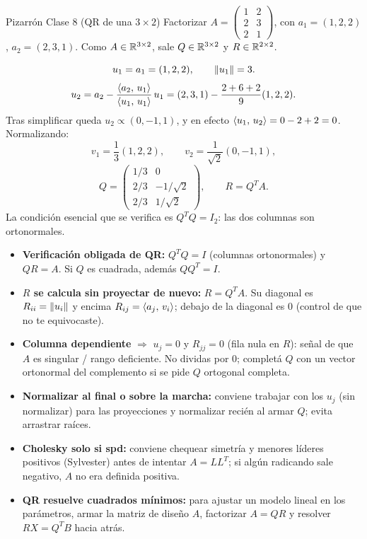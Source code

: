 \begin{ejemplo}{Pizarrón Clase 8 (QR de una $3\times 2$)}
Factorizar $A = \begin{pmatrix} 1 & 2 \\ 2 & 3 \\ 2 & 1 \end{pmatrix}$, con $a_1 = (1,2,2)$, $a_2 = (2,3,1)$. Como $A \in \mathbb{R}^{3\times 2}$, sale $Q \in \mathbb{R}^{3\times 2}$ y $R \in \mathbb{R}^{2\times 2}$.

\[
u_1 = a_1 = (1,2,2), \qquad \left\lVert u_1 \right\rVert = 3.
\]
\[
u_2 = a_2 - \frac{\left\langle a_2,\, u_1 \right\rangle}{\left\langle u_1,\, u_1 \right\rangle}\,u_1 = (2,3,1) - \frac{2+6+2}{9}(1,2,2).
\]
Tras simplificar queda $u_2 \propto (0,-1,1)$, y en efecto $\left\langle u_1,\, u_2 \right\rangle = 0 - 2 + 2 = 0$. Normalizando:
\[
v_1 = \frac{1}{3}(1,2,2), \qquad v_2 = \frac{1}{\sqrt{2}}(0,-1,1),
\]
\[
Q = \begin{pmatrix} 1/3 & 0 \\ 2/3 & -1/\sqrt{2} \\ 2/3 & 1/\sqrt{2} \end{pmatrix}, \qquad R = Q^T A.
\]
La condición esencial que se verifica es $Q^T Q = I_2$: las dos columnas son ortonormales.
\end{ejemplo}

\begin{truco}
\begin{itemize}
\item \textbf{Verificación obligada de QR:} $Q^T Q = I$ (columnas ortonormales) y $QR = A$. Si $Q$ es cuadrada, además $QQ^T = I$.
\item \textbf{$R$ se calcula sin proyectar de nuevo:} $R = Q^T A$. Su diagonal es $R_{ii} = \left\lVert u_i \right\rVert$ y encima $R_{ij} = \left\langle a_j,\, v_i \right\rangle$; debajo de la diagonal es $0$ (control de que no te equivocaste).
\item \textbf{Columna dependiente} $\Rightarrow$ $u_j = 0$ y $R_{jj} = 0$ (fila nula en $R$): señal de que $A$ es singular / rango deficiente. No dividas por $0$; completá $Q$ con un vector ortonormal del complemento si se pide $Q$ ortogonal completa.
\item \textbf{Normalizar al final o sobre la marcha:} conviene trabajar con los $u_j$ (sin normalizar) para las proyecciones y normalizar recién al armar $Q$; evita arrastrar raíces.
\item \textbf{Cholesky solo si spd:} conviene chequear simetría y menores líderes positivos (Sylvester) antes de intentar $A = LL^T$; si algún radicando sale negativo, $A$ no era definida positiva.
\item \textbf{QR resuelve cuadrados mínimos:} para ajustar un modelo lineal en los parámetros, armar la matriz de diseño $A$, factorizar $A=QR$ y resolver $RX = Q^T B$ hacia atrás.
\end{itemize}
\end{truco}
